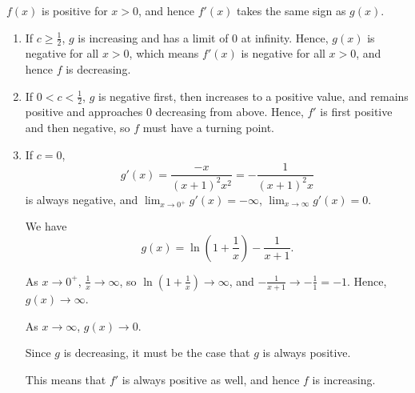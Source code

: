 \begin{enumerate}
          \(f(x)\) is positive for \(x > 0\), and hence \(f'(x)\) takes the same sign as \(g(x)\).

          \begin{enumerate}
              \item If \(c \geq \frac{1}{2}\), \(g\) is increasing and has a limit of \(0\) at infinity. Hence, \(g(x)\) is negative for all \(x > 0\), which means \(f'(x)\) is negative for all \(x > 0\), and hence \(f\) is decreasing.
              \item If \(0 < c < \frac{1}{2}\), \(g\) is negative first, then increases to a positive value, and remains positive and approaches \(0\) decreasing from above. Hence, \(f'\) is first positive and then negative, so \(f\) must have a turning point.
              \item If \(c = 0\),
                    \[
                        g'(x) = \frac{-x}{(x + 1)^2 x^2} = - \frac{1}{(x + 1)^2 x}
                    \]
                    is always negative, and \(\lim_{x \to 0^{+}} g'(x) =-\infty\), \(\lim_{x \to \infty} g'(x) = 0\).

                    We have
                    \[
                        g(x) = \ln \left(1 + \frac{1}{x}\right) - \frac{1}{x + 1}.
                    \]

                    As \(x \to 0^{+}\), \(\frac{1}{x} \to \infty\), so \(\ln \left(1 + \frac{1}{x}\right) \to \infty\), and \(- \frac{1}{x + 1} \to - \frac{1}{1} = -1\). Hence, \(g(x) \to \infty\).

                    As \(x \to \infty\), \(g(x) \to 0\).

                    Since \(g\) is decreasing, it must be the case that \(g\) is always positive.

                    This means that \(f'\) is always positive as well, and hence \(f\) is increasing.
          \end{enumerate}
\end{enumerate}